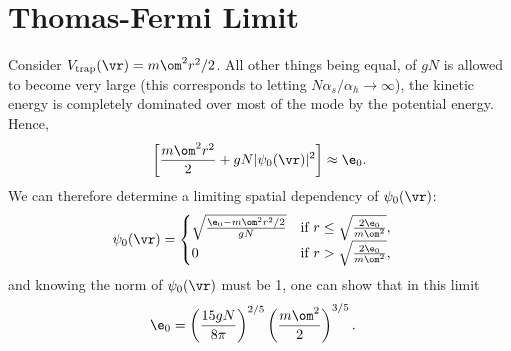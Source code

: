 \documentclass[a4paper, 11pt, normalem]{report}
\begin{document}
\section{Thomas-Fermi Limit}
Consider $V_{\text{trap}}(\vr) = m\om^2r^2/2$.
All other things being equal, of $gN$ is allowed to become very large (this corresponds to letting $N\alpha_s/\alpha_h\to\infty$), the kinetic energy is completely dominated over most of the mode by the potential energy.
Hence,
\begin{align}
    \left[\frac{m\om^2r^2}{2}+gN|\psi_0(\vr)|^2\right]\approx \e_0.
\end{align}
We can therefore determine a limiting spatial dependency of $\psi_0(\vr)$:
\begin{align}
    \psi_0(\vr) &= \begin{cases} \sqrt{\frac{\e_0-m\om^2r^2/2}{gN}} & \text{if } r\leq\sqrt{\frac{2\e_0}{m\om^2}}, \\ 0 & \text{if } r > \sqrt{\frac{2\e_0}{m\om^2}}, \end{cases}
\end{align}
and knowing the norm of $\psi_0(\vr)$ must be 1, one can show that in this limit
\begin{align}
    \e_0 &= \left(\frac{15gN}{8\pi}\right)^{2/5}\left(\frac{m\om^2}{2}\right)^{3/5}.
\end{align}
\end{document}
